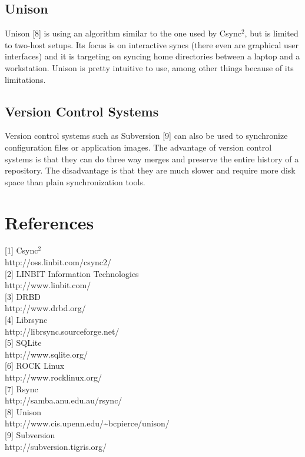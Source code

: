 \documentclass[a4paper,twocolumn]{article}
\def\csync2{{\sc Csync$^{2}$}}
\begin{document}
\subsection{Unison}

Unison [8] is using an algorithm similar to the one used by \csync2, but is
limited to two-host setups. Its focus is on interactive syncs (there even are
graphical user interfaces) and it is targeting on syncing home directories
between a laptop and a workstation. Unison is pretty intuitive to use, among
other things because of its limitations.

\subsection{Version Control Systems}

Version control systems such as Subversion [9] can also be used to synchronize
configuration files or application images. The advantage of version control
systems is that they can do three way merges and preserve the entire history
of a repository. The disadvantage is that they are much slower and require more
disk space than plain synchronization tools.

\section{References}

{[1]} \csync2 \\
http://oss.linbit.com/csync2/
\medskip \\
{[2]} LINBIT Information Technologies \\
http://www.linbit.com/
\medskip \\
{[3]} DRBD \\
http://www.drbd.org/
\medskip \\
{[4]} Librsync \\
http://librsync.sourceforge.net/
\medskip \\
{[5]} SQLite \\
http://www.sqlite.org/
\medskip \\
{[6]} ROCK Linux \\
http://www.rocklinux.org/
\medskip \\
{[7]} Rsync \\
http://samba.anu.edu.au/rsync/
\medskip \\
{[8]} Unison \\
http://www.cis.upenn.edu/\textasciitilde{}bcpierce/unison/
\medskip \\
{[9]} Subversion \\
http://subversion.tigris.org/
\end{document}
